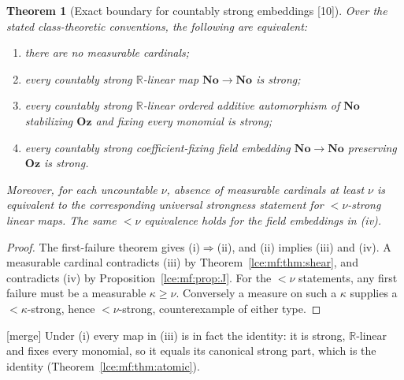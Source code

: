 \documentclass[11pt,letterpaper]{article}
\numberwithin{equation}{section}
\newtheorem{theorem}{Theorem}[section]
\theoremstyle{definition}
\theoremstyle{remark}
\newcommand{\No}{\mathbf{No}}
\newcommand{\Oz}{\mathbf{Oz}}
\newcommand{\R}{\mathbb R}
\newcommand{\thref}[1]{Theorem~\ref{#1}}
\newcommand{\prref}[1]{Proposition~\ref{#1}}
\newcommand{\src}[1]{\textup{\textsf{\small[#1]}}}%
\newcommand{\mergetag}{\textup{\textsf{\small[merge]}}}%
\begin{document}
\begin{theorem}[Exact boundary for countably strong embeddings \src{10}]\label{lce:mf:thm:equivalence}
Over the stated class-theoretic conventions, the following are equivalent:
\begin{enumerate}[label=\textup{(\roman*)}]
\item there are no measurable cardinals;
\item every countably strong $\R$-linear map $\No\to\No$ is strong;
\item every countably strong $\R$-linear ordered additive automorphism of
$\No$ stabilizing $\Oz$ and fixing every monomial is strong;
\item every countably strong coefficient-fixing field embedding $\No\to\No$
preserving $\Oz$ is strong.
\end{enumerate}
Moreover, for each uncountable $\nu$, absence of measurable cardinals at
least $\nu$ is equivalent to the corresponding universal strongness
statement for ${<}\nu$-strong linear maps. The same ${<}\nu$ equivalence
holds for the field embeddings in (iv).
\end{theorem}
\begin{proof}
The first-failure theorem gives (i)$\Rightarrow$(ii), and (ii) implies (iii)
and (iv). A measurable cardinal contradicts (iii) by \thref{lce:mf:thm:shear},
and contradicts (iv) by \prref{lce:mf:prop:J}. For the ${<}\nu$ statements,
any first failure must be a measurable $\kappa\ge\nu$. Conversely a measure
on such a $\kappa$ supplies a ${<}\kappa$-strong, hence ${<}\nu$-strong,
counterexample of either type.
\end{proof}
\mergetag{} Under (i) every map in (iii) is in fact the identity: it is
strong, $\R$-linear and fixes every monomial, so it equals its canonical
strong part, which is the identity (\thref{lce:mf:thm:atomic}).
\end{document}
